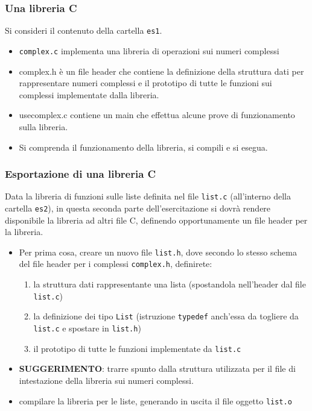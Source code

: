 \documentclass{beamer}
\begin{document}
\begin{frame}[fragile]
\frametitle{Una libreria C}
Si consideri il contenuto della cartella \texttt{es1}.
\begin{itemize}
 \item \texttt{complex.c} implementa una libreria di operazioni sui numeri complessi
 \item complex.h è un file header che contiene la definizione della struttura dati per rappresentare numeri complessi e il prototipo di tutte le funzioni sui complessi implementate dalla libreria.
 \item usecomplex.c contiene un main che effettua alcune prove di funzionamento sulla libreria.
 \item Si comprenda il funzionamento della libreria, si compili e si esegua.
\end{itemize}
\end{frame}

\begin{frame}[fragile]
\frametitle{Esportazione di una libreria C}
Data la libreria di funzioni sulle liste definita nel file \texttt{list.c} (all'interno della cartella \texttt{es2}), in questa seconda parte dell'esercitazione si dovrà rendere disponibile la libreria ad altri file C, definendo opportunamente un file header per la libreria.
\begin{itemize}
 \item Per prima cosa, creare un nuovo file \texttt{list.h}, dove secondo lo stesso schema del file header per i complessi \texttt{complex.h}, definirete:
 \begin{enumerate}
  \item la struttura dati rappresentante una lista (spostandola nell'header dal file \texttt{list.c})
  \item la definizione dei tipo \texttt{List} (istruzione \texttt{typedef} anch'essa da togliere da \texttt{list.c} e spostare in \texttt{list.h})
  \item il prototipo di tutte le funzioni implementate da \texttt{list.c}
 \end{enumerate}
 \item \textbf{SUGGERIMENTO}: trarre spunto dalla struttura utilizzata per il file di intestazione della libreria sui numeri complessi.
 \item compilare la libreria per le liste, generando in uscita il file oggetto \texttt{list.o}
\end{itemize}
\end{frame}
\end{document}
